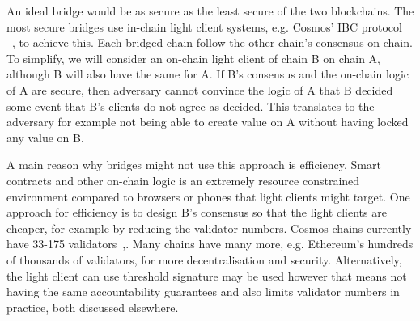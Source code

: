\noindent An ideal bridge would be as secure as the least secure of the two blockchains. The most secure bridges use in-chain light client systems, e.g. Cosmos’ IBC protocol ~\cite{IBC_paper}, to achieve this. Each bridged chain follow the other chain's consensus on-chain. To simplify, we will consider an on-chain light client of chain B on chain A, although B will also have the same for A. If B's consensus and the on-chain logic of A are secure, then adversary cannot convince the logic of A that B decided some event that B's clients do not agree as decided. This translates to the adversary for example not being able to create value on A without having locked any value on B.

\noindent A main reason why bridges might not use this approach is efficiency. Smart contracts and other on-chain logic is an extremely resource constrained environment compared to browsers or phones that light clients might target. One approach for efficiency is to design B's consensus so that the light clients are cheaper, for example by reducing the validator numbers. Cosmos chains currently have 33-175 validators~\cite{CosmosValNYX},\cite{CosmosValHUB}. Many chains have many more, e.g. Ethereum's hundreds of thousands of validators, for more decentralisation and security. Alternatively, the light client can use threshold signature may be used however that means not having the same accountability guarantees and also limits validator numbers in practice, both discussed elsewhere. 


